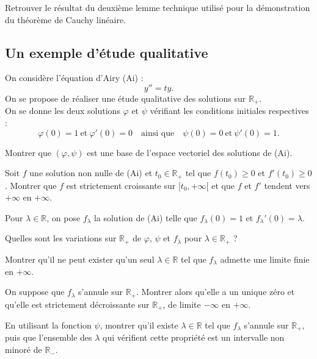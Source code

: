 \documentclass[french]{article}
\newcommand{\R}{\mathbb{R}}
\theoremstyle{plain}
\theoremstyle{definition}
\theoremstyle{remark}
\begin{document}
\begin{exo}
	Retrouver le résultat du deuxième lemme technique utilisé pour la démonstration du théorème de Cauchy linéaire. %
\end{exo}

\subsection{Un exemple d'étude qualitative}
On considère l'équation d'Airy (Ai) :
$$y''=ty.$$
On se propose de réaliser une étude qualitative des solutions sur $\R_+$.\\
On se donne les deux solutions $\varphi$ et $\psi$ vérifiant les conditions initiales respectives :
$$\varphi(0)=1\ \text{et}\ \varphi'(0)=0\quad\text{ainsi que}\quad \psi(0)=0\ \text{et}\ \psi'(0)=1.$$

\begin{exo}
	Montrer que $(\varphi,\psi)$ est une base de l'espace vectoriel des solutions de (Ai).
\end{exo}

\begin{exo}
	Soit $f$ une solution non nulle de (Ai) et $t_0\in\R_+$ tel que $f(t_0)\geqslant0$ et $f'(t_0)\geqslant0$. Montrer que $f$ est strictement croissante sur $[t_0,+\infty[$ et que $f$ et $f'$ tendent vers $+\infty$ en $+\infty$.
\end{exo}

Pour $\lambda\in\R$, on pose $f_\lambda$ la solution de (Ai) telle que $f_\lambda(0)=1$ et $f_\lambda'(0)=\lambda$.

\begin{exo}
	Quelles sont les variations sur $\R_+$ de $\varphi$, $\psi$ et $f_\lambda$ pour $\lambda\in\R_+$ ?
\end{exo}

\begin{exo}
	Montrer qu'il ne peut exister qu'un seul $\lambda\in\R$ tel que $f_\lambda$ admette une limite finie en $+\infty$.
\end{exo}

\begin{exo}
	On suppose que $f_\lambda$ s'annule sur $\R_+$. Montrer alors qu'elle a un unique zéro et qu'elle est strictement décroissante sur $\R_+$, de limite $-\infty$ en $+\infty$.
\end{exo}

\begin{exo}
	En utilisant la fonction $\psi$, montrer qu'il existe $\lambda\in\R$ tel que $f_\lambda$ s'annule sur $\R_+$, puis que l'ensemble des $\lambda$ qui vérifient cette propriété est un intervalle non minoré de $\R_-$.
\end{exo}
\end{document}
